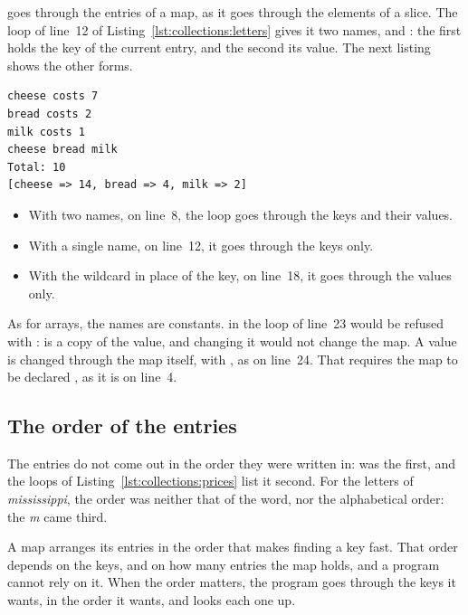  goes through the entries of a map, as it goes through the elements
of a slice. The loop of line~12 of Listing~\ref{lst:collections:letters} gives
it two names,  and : the first holds the key of the
current entry, and the second its value. The next listing shows the other forms.


\vspace{-10pt}%
\begin{lstlisting}[style=bashVerb]
cheese costs 7
bread costs 2
milk costs 1
cheese bread milk
Total: 10
[cheese => 14, bread => 4, milk => 2]
\end{lstlisting}

\begin{itemize}
\item With two names, on line~8, the loop goes through the keys and their
  values.
\item With a single name, on line~12, it goes through the keys only.
\item With the wildcard in place of the key, on line~18, it goes through the
  values only.
\end{itemize}

As for arrays, the names are constants.  in the loop
of line~23 would be refused with :  is a copy of the value, and changing
it would not change the map. A value is changed through the map itself, with
, as on line~24. That requires the map to be
declared , as it is on line~4.

\subsection{The order of the entries}

The entries do not come out in the order they were written in: 
was the first, and the loops of Listing~\ref{lst:collections:prices} list it
second. For the letters of \textit{mississippi}, the order was neither that of
the word, nor the alphabetical order: the \textit{m} came third.

A map arranges its entries in the order that makes finding a key fast. That
order depends on the keys, and on how many entries the map holds, and a program
cannot rely on it. When the order matters, the program goes through the keys it
wants, in the order it wants, and looks each one up.

